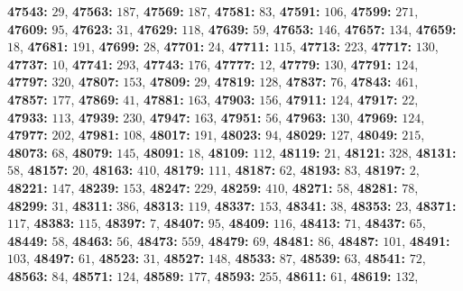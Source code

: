 \textsf{\bfseries 47543:} $29$, \textsf{\bfseries 47563:} $187$, \textsf{\bfseries 47569:} $187$, \textsf{\bfseries 47581:} $83$, \textsf{\bfseries 47591:} $106$, \textsf{\bfseries 47599:} $271$, \textsf{\bfseries 47609:} $95$, \textsf{\bfseries 47623:} $31$, \textsf{\bfseries 47629:} $118$, \textsf{\bfseries 47639:} $59$, \textsf{\bfseries 47653:} $146$, \textsf{\bfseries 47657:} $134$, \textsf{\bfseries 47659:} $18$, \textsf{\bfseries 47681:} $191$, \textsf{\bfseries 47699:} $28$, \textsf{\bfseries 47701:} $24$, \textsf{\bfseries 47711:} $115$, \textsf{\bfseries 47713:} $223$, \textsf{\bfseries 47717:} $130$, \textsf{\bfseries 47737:} $10$, \textsf{\bfseries 47741:} $293$, \textsf{\bfseries 47743:} $176$, \textsf{\bfseries 47777:} $12$, \textsf{\bfseries 47779:} $130$, \textsf{\bfseries 47791:} $124$, \textsf{\bfseries 47797:} $320$, \textsf{\bfseries 47807:} $153$, \textsf{\bfseries 47809:} $29$, \textsf{\bfseries 47819:} $128$, \textsf{\bfseries 47837:} $76$, \textsf{\bfseries 47843:} $461$, \textsf{\bfseries 47857:} $177$, \textsf{\bfseries 47869:} $41$, \textsf{\bfseries 47881:} $163$, \textsf{\bfseries 47903:} $156$, \textsf{\bfseries 47911:} $124$, \textsf{\bfseries 47917:} $22$, \textsf{\bfseries 47933:} $113$, \textsf{\bfseries 47939:} $230$, \textsf{\bfseries 47947:} $163$, \textsf{\bfseries 47951:} $56$, \textsf{\bfseries 47963:} $130$, \textsf{\bfseries 47969:} $124$, \textsf{\bfseries 47977:} $202$, \textsf{\bfseries 47981:} $108$, \textsf{\bfseries 48017:} $191$, \textsf{\bfseries 48023:} $94$, \textsf{\bfseries 48029:} $127$, \textsf{\bfseries 48049:} $215$, \textsf{\bfseries 48073:} $68$, \textsf{\bfseries 48079:} $145$, \textsf{\bfseries 48091:} $18$, \textsf{\bfseries 48109:} $112$, \textsf{\bfseries 48119:} $21$, \textsf{\bfseries 48121:} $328$, \textsf{\bfseries 48131:} $58$, \textsf{\bfseries 48157:} $20$, \textsf{\bfseries 48163:} $410$, \textsf{\bfseries 48179:} $111$, \textsf{\bfseries 48187:} $62$, \textsf{\bfseries 48193:} $83$, \textsf{\bfseries 48197:} $2$, \textsf{\bfseries 48221:} $147$, \textsf{\bfseries 48239:} $153$, \textsf{\bfseries 48247:} $229$, \textsf{\bfseries 48259:} $410$, \textsf{\bfseries 48271:} $58$, \textsf{\bfseries 48281:} $78$, \textsf{\bfseries 48299:} $31$, \textsf{\bfseries 48311:} $386$, \textsf{\bfseries 48313:} $119$, \textsf{\bfseries 48337:} $153$, \textsf{\bfseries 48341:} $38$, \textsf{\bfseries 48353:} $23$, \textsf{\bfseries 48371:} $117$, \textsf{\bfseries 48383:} $115$, \textsf{\bfseries 48397:} $7$, \textsf{\bfseries 48407:} $95$, \textsf{\bfseries 48409:} $116$, \textsf{\bfseries 48413:} $71$, \textsf{\bfseries 48437:} $65$, \textsf{\bfseries 48449:} $58$, \textsf{\bfseries 48463:} $56$, \textsf{\bfseries 48473:} $559$, \textsf{\bfseries 48479:} $69$, \textsf{\bfseries 48481:} $86$, \textsf{\bfseries 48487:} $101$, \textsf{\bfseries 48491:} $103$, \textsf{\bfseries 48497:} $61$, \textsf{\bfseries 48523:} $31$, \textsf{\bfseries 48527:} $148$, \textsf{\bfseries 48533:} $87$, \textsf{\bfseries 48539:} $63$, \textsf{\bfseries 48541:} $72$, \textsf{\bfseries 48563:} $84$, \textsf{\bfseries 48571:} $124$, \textsf{\bfseries 48589:} $177$, \textsf{\bfseries 48593:} $255$, \textsf{\bfseries 48611:} $61$, \textsf{\bfseries 48619:} $132$, 
